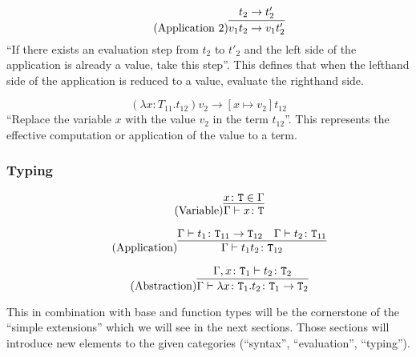 \begin{equation*}
    \tag{Application 2}
    \infer{
        v_1 t_2 \rightarrow v_1 t'_2
    }{
        t_2 \rightarrow t'_2
    }
\end{equation*}
``If there exists an evaluation step from $t_2$ to $t'_2$ and the left
side of the application is already a value, take this step''. This defines
that when the lefthand side of the application is reduced to a value, evaluate
the righthand side.

\begin{equation*}
    \tag{Application Abstraction}
    (\lambda x \colon T_{11} . t_{12}) v_2 \rightarrow [x \mapsto v_2] t_{12}
\end{equation*}
``Replace the variable $x$ with the value $v_2$ in the term $t_{12}$''. This represents
the effective computation or application of the value to a term.

\subsubsection{Typing}
\begin{equation*}
    \tag{Variable}
    \infer{
        \Gamma \vdash x \colon \texttt{T}
    }{
        x \colon \texttt{T} \in \Gamma
    }
\end{equation*}

\begin{equation*}
    \tag{Application}
    \infer{
        \Gamma \vdash t_1 t_2 \colon \texttt{T}_{12}
    }{
        \Gamma \vdash t_1 \colon \texttt{T}_{11} \rightarrow \texttt{T}_{12}
        &
        \Gamma \vdash t_2 \colon \texttt{T}_{11}
    }
\end{equation*}

\begin{equation*}
    \tag{Abstraction}
    \infer{
        \Gamma \vdash \lambda x \colon \texttt{T}_1 . t_2 \colon \texttt{T}_1 \rightarrow \texttt{T}_2
    }{
        \Gamma,x \colon \texttt{T}_1 \vdash t_2 \colon \texttt{T}_2
    }
\end{equation*}

This in combination with base and function types will be the
cornerstone of the ``simple extensions'' which we will see in the
next sections. Those sections will introduce new elements to the given
categories (``syntax'', ``evaluation'', ``typing'').

